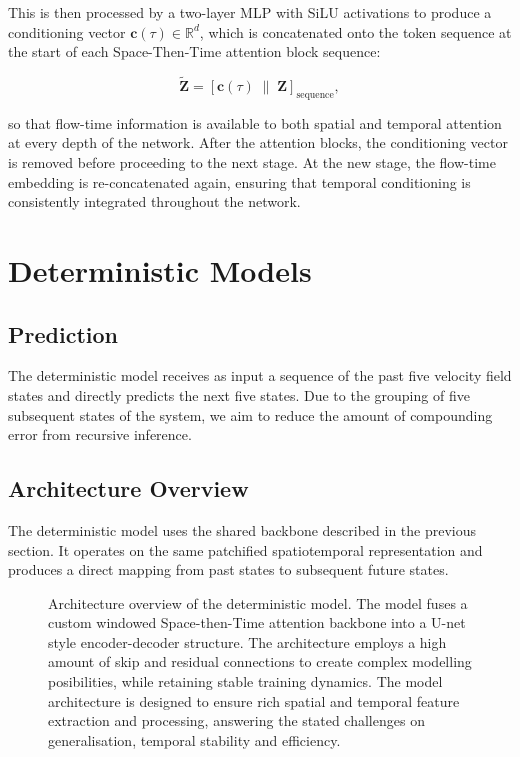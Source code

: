This is then processed by a two-layer MLP with SiLU activations to produce a conditioning vector $\mathbf{c}(\tau) \in \mathbb{R}^{d}$, which is concatenated onto the token sequence at the start of each Space-Then-Time attention block sequence:

\begin{equation}
    \tilde{\mathbf{Z}} = \left[\mathbf{c}(\tau) \;\|\; \mathbf{Z}\right]_{\text{sequence}},
\end{equation}

so that flow-time information is available to both spatial and temporal attention at every depth of the network. After the attention blocks, the conditioning vector is removed before proceeding to the next stage. At the new stage, the flow-time embedding is re-concatenated again, ensuring that temporal conditioning is consistently integrated throughout the network.


\section{Deterministic Models}

\subsection{Prediction}

The deterministic model receives as input a sequence of the past five velocity field states and directly predicts the next five states. Due to the grouping of five subsequent states of the system, we aim to reduce the amount of compounding error from recursive inference.


\subsection{Architecture Overview}

The deterministic model uses the shared backbone described in the previous section. It operates on the same patchified spatiotemporal representation and produces a direct mapping from past states to subsequent future states.

\begin{figure}[h]
	\centering
	\makebox[\textwidth][c]{
		
	}
	\caption{Architecture overview of the deterministic model. The model fuses a custom windowed Space-then-Time attention backbone into a U-net style encoder-decoder structure. The architecture employs a high amount of skip and residual connections to create complex modelling posibilities, while retaining stable training dynamics. The model architecture is designed to ensure rich spatial and temporal feature extraction and processing, answering the stated challenges on generalisation, temporal stability and efficiency.}
	\label{fig:det_model_architecture}
\end{figure}

